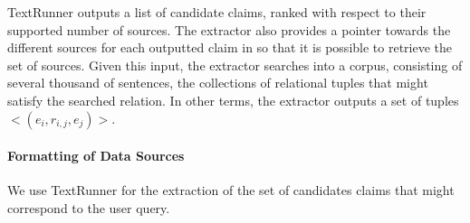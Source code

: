 TextRunner outputs a list of candidate claims, ranked with respect to their supported
number of sources. The extractor also provides a pointer towards the different sources for each outputted claim in so
that it is possible to retrieve the set of sources. Given this input, the extractor searches into a corpus, consisting
of several thousand of sentences, the collections of relational tuples that might satisfy the searched relation. In other
terms, the extractor outputs a set of tuples $<(e_i, r_{i,j}, e_j)>$.

\paragraph*{Formatting of Data Sources}
We use TextRunner for the extraction of the set of 
candidates claims that might correspond to the user query.
